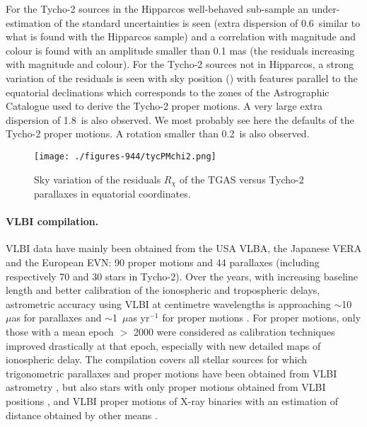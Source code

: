For the Tycho-2 sources in the Hipparcos well-behaved sub-sample an under-estimation of the standard uncertainties is seen (extra dispersion of 0.6\masyr\ similar to what is found with the Hipparcos sample) and a correlation with magnitude and colour is found with an amplitude smaller than 0.1 mas (the residuals increasing with magnitude and colour). 
 For the Tycho-2 sources not in Hipparcos, a strong variation of the residuals is seen with sky position () with features parallel to the equatorial declinations which corresponds to the zones of the Astrographic Catalogue used to derive the Tycho-2 proper motions. A very large extra dispersion of 1.8\masyr\ is also observed. We most probably see here the defaults of the Tycho-2 proper motions. A rotation smaller than 0.2\masyr\ is also observed. 
 
\begin{figure}
    \begin{center}
        \texttt{[image: ./figures-944/tycPMchi2.png]}
        \caption[TGAS versus Tycho-2 proper motions]{Sky variation of the residuals $R_\chi$ of the TGAS versus Tycho-2 parallaxes in equatorial coordinates. }
        \label{fig:cu9val_wp944_tycPM} 
    \end{center}
\end{figure}
 
\paragraph{VLBI compilation.} VLBI data have mainly been obtained from the USA VLBA, the Japanese VERA and the European EVN: 90 proper motions and 44 parallaxes (including respectively 70 and 30 stars in Tycho-2). Over the years, with increasing baseline length and better calibration of the ionospheric and tropospheric delays, astrometric accuracy using VLBI at centimetre wavelengths is approaching ${\sim}$10~$\mu$as for parallaxes and ${\sim}$1~$\mu$as yr$^{-1}$ for proper motions \citep[][and reference therein]{2014ARA&A..52..339R}. For proper motions, only those with a mean epoch $>$ 2000 were considered as calibration techniques improved drastically at that epoch, especially with new detailed maps of ionospheric delay. The compilation covers all stellar sources for which trigonometric parallaxes and proper motions have been obtained from VLBI astrometry \citep[as quoted in the review of][]{2014ARA&A..52..339R}, but also stars with only proper motions obtained from VLBI positions \citep{2007AJ....133..906B}, and VLBI proper motions of X-ray binaries with an estimation of distance obtained by other means \citep{2014PASA...31...16M}.  

